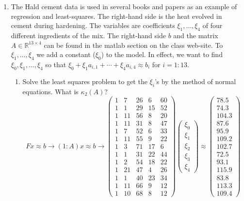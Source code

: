 \documentclass[11pt]{article}
\newcommand{\R}{\mathbb{R}}
\begin{document}
\begin{enumerate}
	\item The Hald cement data is used in several books and papers as an example of regression and least-squares.  The right-hand side is the heat evolved in cement during hardening.  The variables are coefficients \(\xi_1, \dots, \xi_4\) of four different ingredients of the mix.  The right-hand side \(b\) and the matrix \(A \in \R^{13 \times 4}\) can be found in the matlab section on the class web-site.  To \(\xi_1, \dots, \xi_4\) we add a constant (\(\xi_0\)) to the model.  In effect, we want to find \(\xi_0, \xi_1, \dots, \xi_4\) so that \(\xi_0 + \xi_1 a_{i,1} + \cdots + \xi_4 a_{i,4} \approx b_i\) for \(i=1:13\).
	      \begin{enumerate}
		      \item Solve the least squares problem to get the \(\xi_i\)'s by the method of normal equations.  What is \(\kappa_2(A)\)?
		            \[
			            Fx \approx b \to (1 : A)x \approx b \to
			            \begin{pmatrix}
				            1 & 7  & 26 & 6  & 60 \\
				            1 & 1  & 29 & 15 & 52 \\
				            1 & 11 & 56 & 8  & 20 \\
				            1 & 11 & 31 & 8  & 47 \\
				            1 & 7  & 52 & 6  & 33 \\
				            1 & 11 & 55 & 9  & 22 \\
				            1 & 3  & 71 & 17 & 6  \\
				            1 & 1  & 31 & 22 & 44 \\
				            1 & 2  & 54 & 18 & 22 \\
				            1 & 21 & 47 & 4  & 26 \\
				            1 & 1  & 40 & 23 & 34 \\
				            1 & 11 & 66 & 9  & 12 \\
				            1 & 10 & 68 & 8  & 12
			            \end{pmatrix}
			            \begin{pmatrix}
				            \xi_0 \\ \xi_1 \\ \xi_2 \\ \xi_3 \\ \xi_4
			            \end{pmatrix}
			            \approx
			            \begin{pmatrix}
				            78.5 \\ 74.3 \\ 104.3 \\ 87.6 \\ 95.9 \\ 109.2 \\ 102.7 \\ 72.5 \\ 93.1 \\ 115.9 \\ 83.8 \\ 113.3 \\ 109.4

\end{pmatrix}\]
\end{enumerate}
\end{enumerate}
\end{document}

